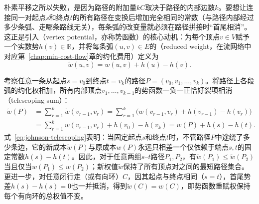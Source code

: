 朴素平移之所以失败，是因为路径的附加量$kC$取决于路径的内部边数$k$。要想让连接同一对起点$s$和终点$t$的所有路径在变换后增加完全相同的常数（与路径内部经过多少条弧、走哪条路线无关），每条弧的改变量就必须在路径拼接时“首尾相消”。这正是引入（vertex potential，亦称势函数）的核心动机：为每个顶点$v\in V$赋予一个实数势$h(v)\in\mathbb R$，并将每条弧$(u,v)\in E$的（reduced weight，在流网络中对应第~\ref{chap:min-cost-flow}章的约化费用）定义为
\begin{equation}
  \tilde w(u,v) = w(u,v) + h(u) - h(v).
  \label{eq:johnson-reduced-weight}
\end{equation}

考察任意一条从起点$s=v_0$到终点$t=v_k$的路径$P=(v_0,v_1,\ldots,v_k)$。将路径上各段弧的约化权相加，所有内部顶点$v_1,\ldots,v_{k-1}$的势函数一负一正恰好裂项相消（telescoping sum）：
\begin{equation}
  \begin{aligned}
    \tilde w(P) &= \sum_{r=1}^{k}\tilde w(v_{r-1},v_r)
    = \sum_{r=1}^{k}\bigl(w(v_{r-1},v_r) + h(v_{r-1}) - h(v_r)\bigr) \\
    &= \sum_{r=1}^{k}w(v_{r-1},v_r) + h(v_0) - h(v_k)
    = w(P) + h(s) - h(t).
  \end{aligned}
  \label{eq:johnson-telescoping}
\end{equation}
式~\eqref{eq:johnson-telescoping}表明：当固定起点$s$和终点$t$时，不管路径$P$中途绕了多少条边，它的新成本$\tilde w(P)$与原成本$w(P)$永远只相差一个仅依赖于端点$s,t$的固定常数$h(s)-h(t)$。因此，对于任意两组$s$--$t$路径$P_1,P_2$，有$\tilde w(P_1)\leq\tilde w(P_2)$当且仅当$w(P_1)\leq w(P_2)$；新权值$\tilde w$保持了所有顶点对之间的最短路径集合。更进一步，对任意闭行走（或有向环）$C$，因其起点与终点相同（$s=t$），首尾势差$h(s)-h(s)=0$也一并抵消，得到$\tilde w(C)=w(C)$，即势函数重赋权保持每个有向环的总权值不变。

